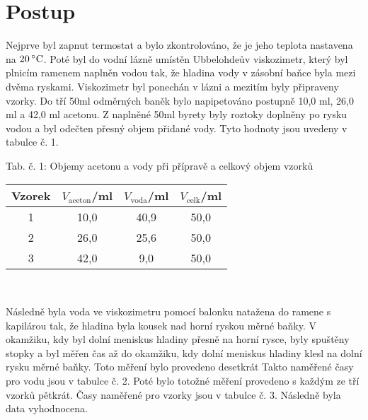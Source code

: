 \documentclass[12pt,a4paper]{article}
\def\ri#1{\mathrm{#1}}
\def\jd#1{\ifmmode\,\mathrm{#1}\else\,\textrm{#1}\fi}
\begin{document}
\section*{Postup}
Nejprve byl zapnut termostat a bylo zkontrolováno, že je jeho teplota nastavena na $20\jd{^\circ C}$. Poté byl do vodní lázně umístěn Ubbelohdeův viskozimetr, který byl plnicím ramenem naplněn vodou tak, že hladina vody v zásobní baňce byla mezi dvěma ryskami. Viskozimetr byl ponechán v lázni a mezitím byly připraveny vzorky. Do tří 50ml odměrných baněk bylo napipetováno postupně 10,0\jd{ml}, 26,0\jd{ml} a 42,0\jd{ml} acetonu. Z naplněné 50ml byrety byly roztoky doplněny po rysku vodou a byl odečten přesný objem přidané vody. Tyto hodnoty jsou uvedeny v tabulce č. 1. 
\begin{center}
		\noindent Tab. č. 1: Objemy acetonu a vody při přípravě a celkový objem vzorků\\
		\begin{tabular}{c|c|c|c}
			Vzorek & $V_\ri{aceton}$/ml & $V_\ri{voda}$/ml & $V_\ri{celk}$/ml \\
			\hline
			1 & 10,0 & 40,9 & 50,0\\
			2 & 26,0 & 25,6 & 50,0\\
			3 & 42,0 & 9,0 & 50,0\\
		\end{tabular}\\
\end{center}
Následně byla voda ve viskozimetru pomocí balonku natažena do ramene s kapilárou tak, že hladina byla kousek nad horní ryskou měrné baňky. V okamžiku, kdy byl dolní meniskus hladiny přesně na horní rysce, byly spuštěny stopky a byl měřen čas až do okamžiku, kdy dolní meniskus hladiny klesl na dolní rysku měrné baňky. Toto měření bylo provedeno desetkrát Takto naměřené časy pro vodu jsou v tabulce č. 2. Poté bylo totožné měření provedeno s každým ze tří vzorků pětkrát. Časy naměřené pro vzorky jsou v tabulce č. 3. Následně byla data vyhodnocena.
\end{document}
